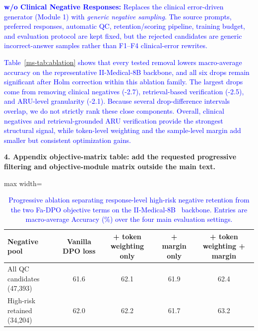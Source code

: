 \documentclass[12pt]{article}
\newcommand{\added}[1]{\textcolor{blue}{#1}}
\begin{document}
\begin{displayquote}
\added{\textbf{w/o Clinical Negative Responses:} Replaces the clinical error-driven
generator (Module 1) with \textit{generic negative sampling}. The source prompts,
preferred responses, automatic QC, retention/scoring pipeline, training budget,
and evaluation protocol are kept fixed, but the rejected candidates are generic
incorrect-answer samples rather than F1--F4 clinical-error rewrites.}
\end{displayquote}

\begin{displayquote}
\added{Table~\ref*{ms-tab:ablation} shows that every tested removal lowers
macro-average accuracy on the representative II-Medical-8B backbone, and all six
drops remain significant after Holm correction within this ablation family. The
largest drops come from removing clinical negatives (-2.7), retrieval-based
verification (-2.5), and ARU-level granularity (-2.1). Because several
drop-difference intervals overlap, we do not strictly rank these close components.
Overall, clinical negatives and retrieval-grounded ARU verification provide the
strongest structural signal, while token-level weighting and the sample-level
margin add smaller but consistent optimization gains.}
\end{displayquote}

\textbf{4. Appendix objective-matrix table: add the requested
progressive filtering and objective-module matrix outside the main text.}

\begin{table}[htbp]
\centering
\small
\caption{\added{Progressive ablation separating response-level high-risk negative retention from the two Fa-DPO objective terms on the II-Medical-8B~\cite{intelligentinternet2025iimedical8b} backbone. Entries are macro-average Accuracy (\%) over the four main evaluation settings.}}
\label{tab:response_r114_objective_matrix}
\label{tab:ablation_objective_matrix}
\begin{adjustbox}{max width=\textwidth}
\begingroup\color{blue}
\begin{tabular}{lcccc}
\toprule
\textbf{Negative pool} & \textbf{Vanilla DPO loss} & \textbf{+ token weighting only} & \textbf{+ margin only} & \textbf{+ token weighting + margin} \\
\midrule
All QC candidates (47,393) & 61.6 & 62.1 & 61.9 & 62.4 \\
High-risk retained (34,204) & 62.0 & 62.2 & 61.7 & 63.2 \\
\bottomrule
\end{tabular}
\endgroup
\end{adjustbox}
\end{table}
\end{document}
